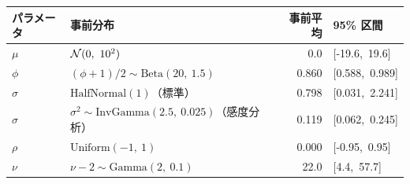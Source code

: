 \begin{tabular}{llrl}
\toprule
パラメータ & 事前分布 & 事前平均 & 95\% 区間 \\
\midrule
$\mu$ & $\Normal(0,\ 10^2)$ & 0.0 & [-19.6,\ 19.6] \\
$\phi$ & $(\phi+1)/2 \sim \mathrm{Beta}(20,\ 1.5)$ & 0.860 & [0.588,\ 0.989] \\
$\sigma$ & $\mathrm{HalfNormal}(1)$（標準） & 0.798 & [0.031,\ 2.241] \\
$\sigma$ & $\sigma^2 \sim \mathrm{InvGamma}(2.5,\ 0.025)$（感度分析） & 0.119 & [0.062,\ 0.245] \\
$\rho$ & $\mathrm{Uniform}(-1,\ 1)$ & 0.000 & [-0.95,\ 0.95] \\
$\nu$ & $\nu-2 \sim \mathrm{Gamma}(2,\ 0.1)$ & 22.0 & [4.4,\ 57.7] \\
\bottomrule
\end{tabular}
